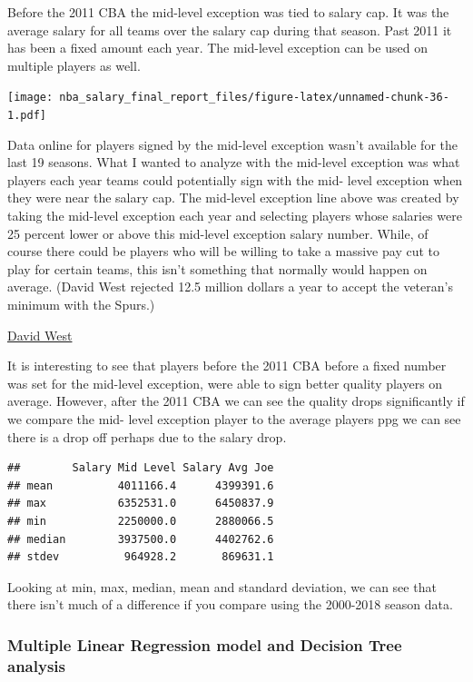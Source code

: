 \documentclass[]{article}
\begin{document}
Before the 2011 CBA the mid-level exception was tied to salary cap. It
was the average salary for all teams over the salary cap during that
season. Past 2011 it has been a fixed amount each year. The mid-level
exception can be used on multiple players as well.

\texttt{[image: nba\_salary\_final\_report\_files/figure-latex/unnamed-chunk-36-1.pdf]}

Data online for players signed by the mid-level exception wasn't
available for the last 19 seasons. What I wanted to analyze with the
mid-level exception was what players each year teams could potentially
sign with the mid- level exception when they were near the salary cap.
The mid-level exception line above was created by taking the mid-level
exception each year and selecting players whose salaries were 25 percent
lower or above this mid-level exception salary number. While, of course
there could be players who will be willing to take a massive pay cut to
play for certain teams, this isn't something that normally would happen
on average. (David West rejected 12.5 million dollars a year to accept
the veteran's minimum with the Spurs.)

\href{https://www.businessinsider.com/nba-david-west-spurs-pay-cut-2015-9}{David
West}

It is interesting to see that players before the 2011 CBA before a fixed
number was set for the mid-level exception, were able to sign better
quality players on average. However, after the 2011 CBA we can see the
quality drops significantly if we compare the mid- level exception
player to the average players ppg we can see there is a drop off perhaps
due to the salary drop.

\begin{verbatim}
##        Salary Mid Level Salary Avg Joe
## mean          4011166.4      4399391.6
## max           6352531.0      6450837.9
## min           2250000.0      2880066.5
## median        3937500.0      4402762.6
## stdev          964928.2       869631.1
\end{verbatim}

Looking at min, max, median, mean and standard deviation, we can see
that there isn't much of a difference if you compare using the 2000-2018
season data.

\subsubsection{\texorpdfstring{\textbf{Multiple Linear Regression model
and Decision Tree
analysis}}{Multiple Linear Regression model and Decision Tree analysis}}\label{multiple-linear-regression-model-and-decision-tree-analysis}
\end{document}
